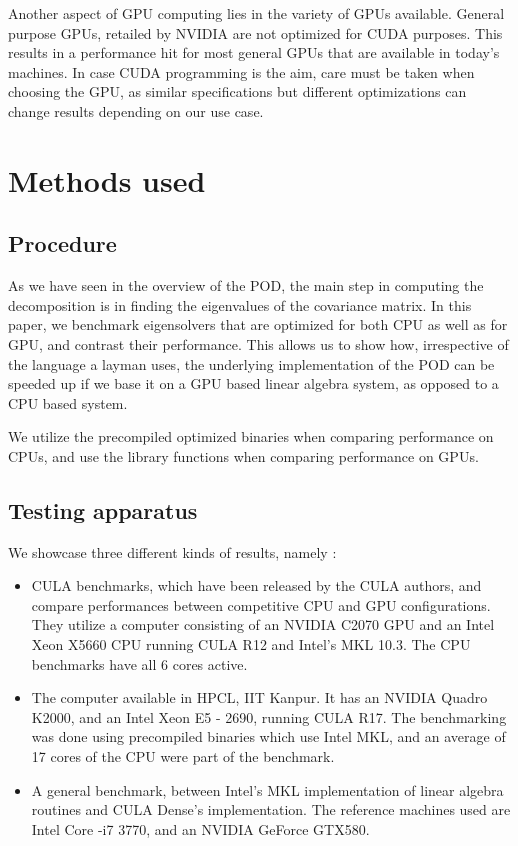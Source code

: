 \documentclass[submit]{aiaa-tc_mod}%
\begin{document}
Another aspect of GPU computing lies in the variety of GPUs available. General purpose GPUs, retailed by NVIDIA are not optimized for CUDA purposes. This results in a performance hit for most general GPUs that are available in today's machines. In case CUDA programming is the aim, care must be taken when choosing the GPU, as similar specifications but different optimizations can change results depending on our use case. 

\clearpage
\section{Methods used}
\subsection{Procedure}

As we have seen in the overview of the POD, the main step in computing the decomposition is in finding the eigenvalues of the covariance matrix. In this paper, we benchmark eigensolvers that are optimized for both CPU as well as for GPU, and contrast their performance. This allows us to show how, irrespective of the language a layman uses, the underlying implementation of the POD can be speeded up if we base it on a GPU based linear algebra system, as opposed to a CPU based system. 

We utilize the precompiled optimized binaries when comparing performance on CPUs, and use the library functions when comparing performance on GPUs. 

\subsection{Testing apparatus}

We showcase three different kinds of results, namely : 
\begin{itemize}
\item
CULA benchmarks, which have been released by the CULA authors, and compare performances between competitive CPU and GPU configurations. They utilize a computer consisting of an NVIDIA C2070 GPU and an Intel Xeon X5660 CPU running CULA R12 and Intel's MKL 10.3. The CPU benchmarks have all 6 cores active.

\item 
The computer available in HPCL, IIT Kanpur. It has an NVIDIA Quadro K2000, and an Intel Xeon E5 - 2690, running CULA R17. The benchmarking was done using precompiled binaries which use Intel MKL, and an average of 17 cores of the CPU were part of the benchmark. 

\item
A general benchmark, between Intel's MKL implementation of linear algebra routines and CULA Dense's implementation. The reference machines used are Intel Core -i7 3770, and an NVIDIA GeForce GTX580.

\end{itemize}
\end{document}
